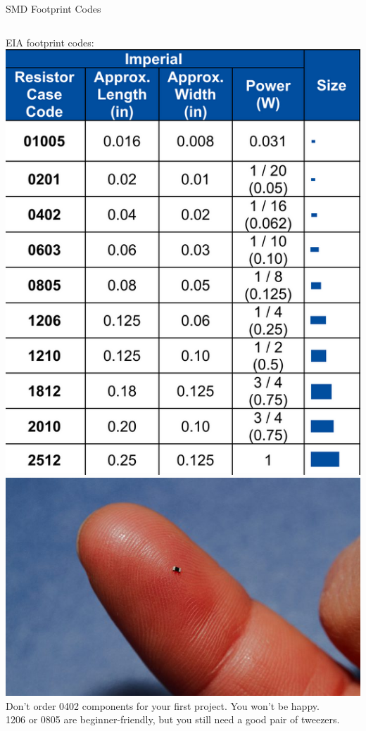 \documentclass{beamer}
\begin{document}
\begin{frame}{SMD Footprint Codes}

  \begin{columns}
    EIA footprint codes:
    \includegraphics[width=\textwidth]{images/EIA-codes.png}
    \includegraphics[width=\textwidth]{images/0402-resistor.png}
  Don't order 0402 components for your first project. You won't be happy.\\
  1206 or 0805 are beginner-friendly, but you still need a good pair of tweezers.
  \end{columns}
\end{frame}
\end{document}
